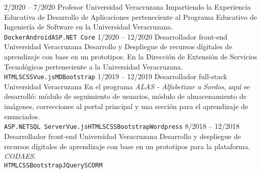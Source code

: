 \documentclass[9pt]{developercv} %
\begin{document}
\begin{entrylist}
    \entry
		{2/2020 -- 7/2020}
		{Profesor}
		{Universidad Veracruzana}
        {Impartiendo la Experiencia Educativa de Desarrollo de Aplicaciones perteneciente al Programa Educativo de Ingeniería de Software en la Universidad Veracruzana.\\
        \texttt{Docker}\slashsep\texttt{Android}\slashsep\texttt{ASP.NET Core}}
	\entry
		{1/2020 -- 12/2020}
		{Desarrollador front-end}
		{Universidad Veracruzana}
        {Desarrollo y Despliegue de recursos dígitales de aprendizaje con base en un prototipos. En la Dirección de Extensión de Servicios Tecnológicos perteneciente a la Universidad Veracruzana.
        \texttt{HTML}\slashsep\texttt{SCSS}\slashsep\texttt{Vue.js}\slashsep\texttt{MDBootstrap}}
	\entry
		{1/2019 -- 12/2019}
		{Desarrollador full-stack}
		{Universidad Veracruzana}
        {En el programa \textit{ALAS - Alfabetizar a Sordos}, aquí se desarrolló: módulo de seguimiento de usuarios, módulo de almacenamiento de imágenes, correcciones al portal principal y una sección para el aprendizaje de enunciados. \\
        \texttt{ASP.NET}\slashsep\texttt{SQL Server}\slashsep\texttt{Vue.js}\slashsep\texttt{HTML}\slashsep\texttt{SCSS}\slashsep\texttt{Bootstrap}\slashsep\texttt{Wordpress}}
	\entry
		{8/2018 -- 12/2018}
		{Desarrollador front-end}
		{Universidad Veracruzana}
        {Desarrollo y despliegue de recursos dígitales de aprendizaje con base en un prototipos para la plataforma. \textit{CODAES}. \\
        \texttt{HTML}\slashsep\texttt{CSS}\slashsep\texttt{Bootstrap}\slashsep\texttt{JQuery}\slashsep\texttt{SCORM}}
\end{entrylist}



	
	
\end{document}
